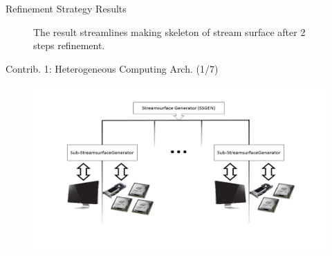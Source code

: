 \documentclass{beamer}
\begin{document}
\begin{frame}{Refinement Strategy Results}
	\begin{figure}
		\centering
		\caption{The result streamlines making skeleton of stream surface after 2 steps refinement.}
	\end{figure}
\end{frame}

\begin{frame}{Contrib. 1: Heterogeneous Computing Arch. (1/7)}
	\begin{figure}
		\includegraphics[width=\linewidth]{figures/MAarch1.PNG}
	\end{figure}
\end{frame}
\end{document}
